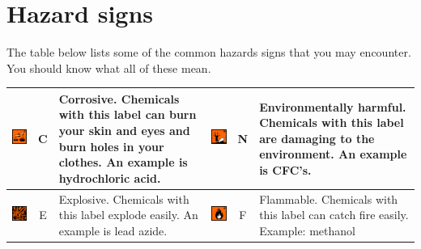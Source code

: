 \section{Hazard signs}
            \nopagebreak
The table below lists some of the common hazards signs that you may encounter. You should know what all of these mean.
 \begin{center}
\tablelasttail{\hline}
  \begin{supertabular}{|l|c|p{3cm}|l|c|p{3cm}|}\hline
\parbox[c]{4em}{\includegraphics[width=.1\textwidth]{photos/corrosive.png}} & C & Corrosive. Chemicals with this label can burn your skin and eyes and burn holes in your clothes. An example is hydrochloric acid. & \parbox[c]{4em}{\includegraphics[width=.1\textwidth]{photos/environment.png}} & N & Environmentally harmful. Chemicals with this label are damaging to the environment. An example is CFC's. \\ \hline 
\parbox[c]{4em}{\includegraphics[width=.1\textwidth]{photos/explosive.png}} & E & Explosive. Chemicals with this label explode easily. An example is lead azide. & \parbox[c]{4em}{\includegraphics[width=.1\textwidth]{photos/flammable.png}} & F & Flammable. Chemicals with this label can catch fire easily. Example: methanol \\ \hline 

\end{supertabular}
\end{center}
